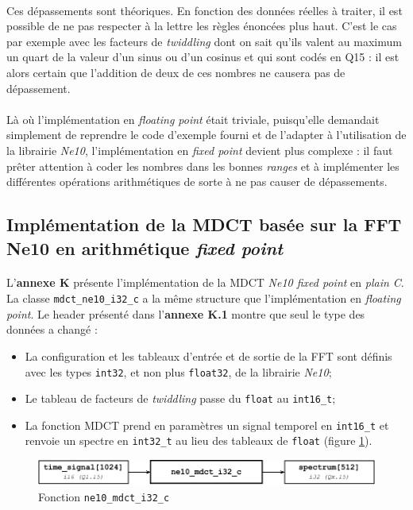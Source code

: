 \documentclass{article}
\begin{document}
    \paragraph{}
    Ces dépassements sont théoriques. En fonction des données réelles à traiter, il est possible de ne pas respecter à la lettre les règles énoncées plus haut. C'est le cas par exemple avec les facteurs de \emph{twiddling} dont on sait qu'ils valent au maximum un quart de la valeur d'un sinus ou d'un cosinus et qui sont codés en Q15 : il est alors certain que l'addition de deux de ces nombres ne causera pas de dépassement.

    \paragraph{}
    Là où l'implémentation en \emph{floating point} était triviale, puisqu'elle demandait simplement de reprendre le code d'exemple fourni et de l'adapter à l'utilisation de la librairie \emph{Ne10}, l'implémentation en \emph{fixed point} devient plus complexe : il faut prêter attention à coder les nombres dans les bonnes \emph{ranges} et à implémenter les différentes opérations arithmétiques de sorte à ne pas causer de dépassements.


    \subsection{Implémentation de la MDCT basée sur la FFT Ne10 en arithmétique \emph{fixed point}}
    \label{sec:ne10_mdct_i32_c}
    \paragraph{}
    L'\textbf{annexe K} présente l'implémentation de la MDCT \emph{Ne10 fixed point} en \emph{plain C}. La classe \texttt{mdct\_ne10\_i32\_c} a la même structure que l'implémentation en \emph{floating point}. Le header présenté dans l'\textbf{annexe K.1} montre que seul le type des données a changé :
    \begin{itemize}
        \item La configuration et les tableaux d'entrée et de sortie de la FFT sont définis avec les types \texttt{int32}, et non plus \texttt{float32}, de la librairie \emph{Ne10};
        \item Le tableau de facteurs de \emph{twiddling} passe du \texttt{float} au \texttt{int16\_t};
        \item La fonction MDCT prend en paramètres un signal temporel en \texttt{int16\_t} et renvoie un spectre en \texttt{int32\_t} au lieu des tableaux de \texttt{float} (figure \ref{fig:func_ne10_mdct_i32_c}).
    \end{itemize}
    \begin{figure}[H]
        \centering
        \includegraphics[width=.8\linewidth]{./images/func_ne10_mdct_i32_c.pdf}
        \caption{Fonction \texttt{ne10\_mdct\_i32\_c}}
        \label{fig:func_ne10_mdct_i32_c}
    \end{figure}
\end{document}
